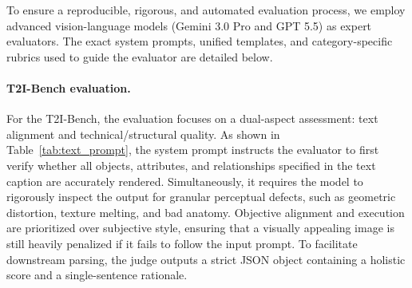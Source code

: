 \documentclass{article}
\begin{document}
To ensure a reproducible, rigorous, and automated evaluation process, we employ advanced vision-language models (Gemini 3.0 Pro and GPT 5.5) as expert evaluators. The exact system prompts, unified templates, and category-specific rubrics used to guide the evaluator are detailed below.

\paragraph{T2I-Bench evaluation.} 
For the T2I-Bench, the evaluation focuses on a dual-aspect assessment: text alignment and technical/structural quality. As shown in Table~\ref{tab:text_prompt}, the system prompt instructs the evaluator to first verify whether all objects, attributes, and relationships specified in the text caption are accurately rendered. Simultaneously, it requires the model to rigorously inspect the output for granular perceptual defects, such as geometric distortion, texture melting, and bad anatomy. Objective alignment and execution are prioritized over subjective style, ensuring that a visually appealing image is still heavily penalized if it fails to follow the input prompt. To facilitate downstream parsing, the judge outputs a strict JSON object containing a holistic score and a single-sentence rationale.

\begin{table}[b]
\centering
\renewcommand{\arraystretch}{1}
\caption{System prompt for T2I-Bench evaluation.}
\label{tab:text_prompt}
\end{table}
\end{document}

